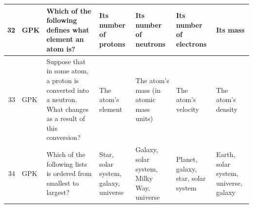 \documentclass[10pt]{article}
\begin{document}
\begin{tiny}
\begin{longtable}{|r|p{0.375in}|p{1.275in}|p{0.75in}|p{0.75in}|p{0.75in}|p{0.75in}|}
    32    &      GPK &                                                                                                                                                                                                                          Which of the following defines what element an atom is? &                                                                                                                 Its number of protons &                                                                                Its number of neutrons &                                                                                                    Its number of electrons &                                                                                                                          Its mass \\\hline
    33    &      GPK &                                                                                                                                                                    Suppose that in some atom, a proton is converted into a neutron. What changes as a result of this conversion? &                                                                                                                    The atom's element &                                                                The atom's mass (in atomic mass units) &                                                                                                        The atom's velocity &                                                                                                                The atom's density \\\hline
    34    &      GPK &                                                                                                                                                                                                                Which of the following lists is ordered from smallest to largest? &                                                                                                  Star, solar system, galaxy, universe &                                                             Galaxy, solar system, Milky Way, universe &                                                                                         Planet, galaxy, star, solar system &                                                                                             Earth, solar system, universe, galaxy \\\hline

\end{longtable}
\end{tiny}
\end{document}
